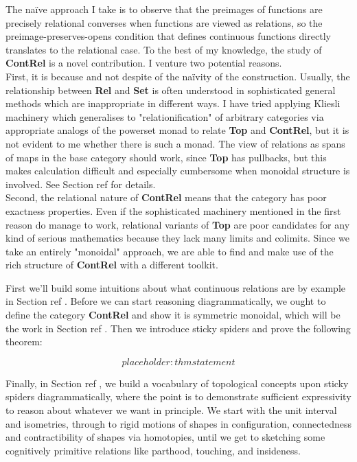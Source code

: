 
The na\"{i}ve approach I take is to observe that the preimages of functions are precisely relational converses when functions are viewed as relations, so the preimage-preserves-opens condition that defines continuous functions directly translates to the relational case. To the best of my knowledge, the study of \textbf{ContRel} is a novel contribution. I venture two potential reasons.\\

First, it is because and not despite of the na\"{i}vity of the construction. Usually, the relationship between \textbf{Rel} and \textbf{Set} is often understood in sophisticated general methods which are inappropriate in different ways. I have tried applying Kliesli machinery which generalises to "relationification" of arbitrary categories via appropriate analogs of the powerset monad to relate \textbf{Top} and \textbf{ContRel}, but it is not evident to me whether there is such a monad. The view of relations as spans of maps in the base category should work, since \textbf{Top} has pullbacks, but this makes calculation difficult and especially cumbersome when monoidal structure is involved. See Section \bR ref \e for details.\\

Second, the relational nature of \textbf{ContRel} means that the category has poor exactness properties. Even if the sophisticated machinery mentioned in the first reason do manage to work, relational variants of \textbf{Top} are poor candidates for any kind of serious mathematics because they lack many limits and colimits. Since we take an entirely "monoidal" approach, we are able to find and make use of the rich structure of \textbf{ContRel} with a different toolkit.

 First we'll build some intuitions about what continuous relations are by example in Section \bR ref \e. Before we can start reasoning diagrammatically, we ought to define the category \textbf{ContRel} and show it is symmetric monoidal, which will be the work in Section \bR ref \e. Then we introduce sticky spiders and prove the following theorem:

\begin{theorem}
\[placeholder: thm statement\]
\end{theorem}

Finally, in Section \bR ref \e, we build a vocabulary of topological concepts upon sticky spiders diagrammatically, where the point is to demonstrate sufficient expressivity to reason about whatever we want in principle. We start with the unit interval and isometries, through to rigid motions of shapes in configuration, connectedness and contractibility of shapes via homotopies, until we get to sketching some cognitively primitive relations like parthood, touching, and insideness.
